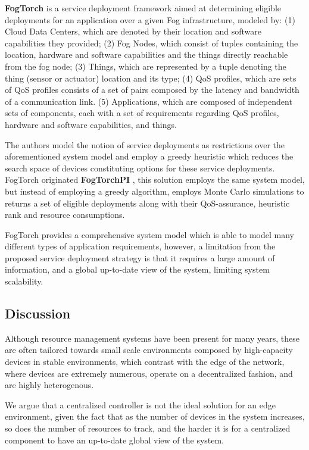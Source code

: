 \textbf{FogTorch} \cite{Brogi2017} is a service deployment framework aimed at determining eligible deployments for an application over a given Fog infrastructure, modeled by: (1) Cloud Data Centers, which are denoted by their location and software capabilities they provided; (2) Fog Nodes, which consist of tuples containing the location, hardware and software capabilities and the things directly reachable from the fog node; (3) Things, which are represented by a tuple denoting the thing (sensor or actuator) location and its type; (4) QoS profiles, which are sets of QoS profiles consists of a set of pairs composed by the latency and bandwidth of a communication link. (5) Applications, which are composed of independent sets of components, each with a set of requirements regarding QoS profiles, hardware and software capabilities, and things.

The authors model the notion of service deployments as restrictions over the aforementioned system model and employ a greedy heuristic which reduces the search space of devices constituting options for these service deployments. FogTorch originated \textbf{FogTorchPI} \cite{brogi2017best}, this solution employs the same system model, but instead of employing a greedy algorithm, employs Monte Carlo simulations to returns a set of eligible deployments along with their QoS-assurance, heuristic rank and resource consumptions. 

FogTorch provides a comprehensive system model which is able to model many different types of application requirements, however, a limitation from the proposed service deployment strategy is that it requires a large amount of information, and a global up-to-date view of the system, limiting system scalability.

\subsection{Discussion}

Although resource management systems have been present for many years, these are often tailored towards small scale environments composed by high-capacity devices in stable environments, which contrast with the edge of the network, where devices are extremely numerous, operate on a decentralized fashion, and are highly heterogenous.

We argue that a centralized controller is not the ideal solution for an edge environment, given the fact that as the number of devices in the system increases, so does the number of resources to track, and the harder it is for a centralized component to have an up-to-date global view of the system. 

